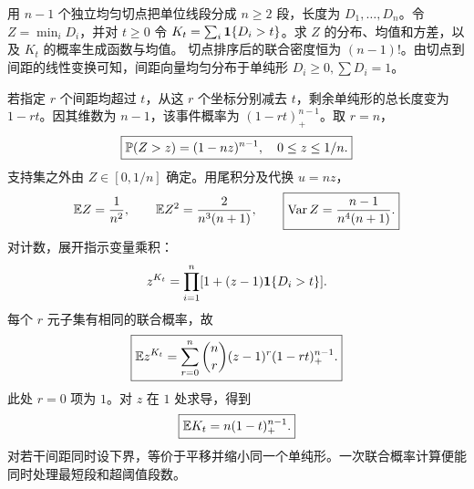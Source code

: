 用 $n-1$ 个独立均匀切点把单位线段分成 $n\ge2$ 段，长度为 $D_1,\ldots,D_n$。令 $Z=\min_iD_i$，并对 $t\ge0$ 令 $K_t=\sum_i\mathbf{1}\{D_i>t\}$。求 $Z$ 的分布、均值和方差，以及 $K_t$ 的概率生成函数与均值。
\solution 切点排序后的联合密度恒为 $(n-1)!$。由切点到间距的线性变换可知，间距向量均匀分布于单纯形 $D_i\ge0,\sum D_i=1$。

若指定 $r$ 个间距均超过 $t$，从这 $r$ 个坐标分别减去 $t$，剩余单纯形的总长度变为 $1-rt$。因其维数为 $n-1$，该事件概率为 $(1-rt)_+^{n-1}$。取 $r=n$，
\[
\boxed{\mathbb{P}(Z>z)=(1-nz)^{n-1},\quad0\le z\le1/n.}
\]
支持集之外由 $Z\in[0,1/n]$ 确定。用尾积分及代换 $u=nz$，
\[
\mathbb{E} Z=\frac1{n^2},\qquad
\mathbb{E} Z^2=\frac2{n^3(n+1)},\qquad
\boxed{\operatorname{Var} Z=\frac{n-1}{n^4(n+1)}.}
\]
对计数，展开指示变量乘积：
\[
z^{K_t}=\prod_{i=1}^n[1+(z-1)\mathbf{1}\{D_i>t\}].
\]
每个 $r$ 元子集有相同的联合概率，故
\[
\boxed{\mathbb{E} z^{K_t}=\sum_{r=0}^n\binom nr(z-1)^r(1-rt)_+^{n-1}.}
\]
此处 $r=0$ 项为 $1$。对 $z$ 在 $1$ 处求导，得到
\[
\boxed{\mathbb{E} K_t=n(1-t)_+^{n-1}.}
\]
\insight 对若干间距同时设下界，等价于平移并缩小同一个单纯形。一次联合概率计算便能同时处理最短段和超阈值段数。
